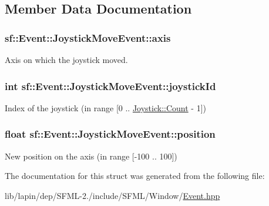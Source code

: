\subsection{Member Data Documentation}
\hypertarget{structsf_1_1_event_1_1_joystick_move_event_add22e8126b7974271991dc6380cbdee3}{
\subsubsection[{axis}]{ sf\-::\-Event\-::\-Joystick\-Move\-Event\-::axis}}\label{structsf_1_1_event_1_1_joystick_move_event_add22e8126b7974271991dc6380cbdee3}


Axis on which the joystick moved. 

\hypertarget{structsf_1_1_event_1_1_joystick_move_event_a7bf2b2f2941a21ed26a67c95f5e4232f}{
\subsubsection[{joystick\-Id}]{ {\bf int} sf\-::\-Event\-::\-Joystick\-Move\-Event\-::joystick\-Id}}\label{structsf_1_1_event_1_1_joystick_move_event_a7bf2b2f2941a21ed26a67c95f5e4232f}


Index of the joystick (in range \mbox{[}0 .. \hyperlink{classsf_1_1_joystick_aa49548ab614125923944b5d340f67a77a58bb2e8f3749310d61097e4361bc0ba8}{Joystick\-::\-Count} -\/ 1\mbox{]}) 

\hypertarget{structsf_1_1_event_1_1_joystick_move_event_aba5a70815420161375fd2e756689c32a}{
\subsubsection[{position}]{\setlength{\rightskip}{0pt plus 5cm}float sf\-::\-Event\-::\-Joystick\-Move\-Event\-::position}}\label{structsf_1_1_event_1_1_joystick_move_event_aba5a70815420161375fd2e756689c32a}


New position on the axis (in range \mbox{[}-\/100 .. 100\mbox{]}) 



The documentation for this struct was generated from the following file\-:\begin{DoxyCompactItemize}
\item 
lib/lapin/dep/\-S\-F\-M\-L-\/2./include/\-S\-F\-M\-L/\-Window/\hyperlink{lib_2lapin_2dep_2_s_f_m_l-2_83_2include_2_s_f_m_l_2_window_2_event_8hpp}{Event.\-hpp}\end{DoxyCompactItemize}
